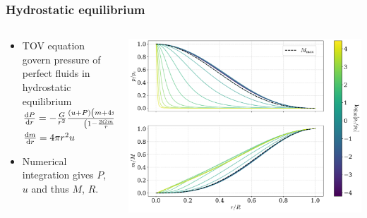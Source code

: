 \documentclass[aspectratio=169]{beamer}
\begin{document}
    \begin{frame}
        \frametitle{Hydrostatic equilibrium}

        \begin{columns}
        \begin{column}{0.4\textwidth}


        \begin{itemize}
            \item TOV equation govern pressure of perfect fluids in hydrostatic equilibrium\\
            $
            \odv{P}{r} = - \frac{G}{r^2} 
            \frac{\left(u + P\right)
            \left(m + 4 \pi r^3 P\right)}
            {\left(1 - \frac{2Gm}{r} \right)}
            ,
            $ \\
            $
            \odv{m}{r} = 4 \pi r^2 u
            $
            \item Numerical integration gives $P$, $u$ and thus $M$, $R$. 
        \end{itemize}

        \end{column}
        \begin{column}{0.6\textwidth}
            \includegraphics[width=\textwidth]{../../scripts/figurer/pion_star/pressure_mass_pion_star.pdf}
        \end{column}
        \end{columns}
    \end{frame}
\end{document}
